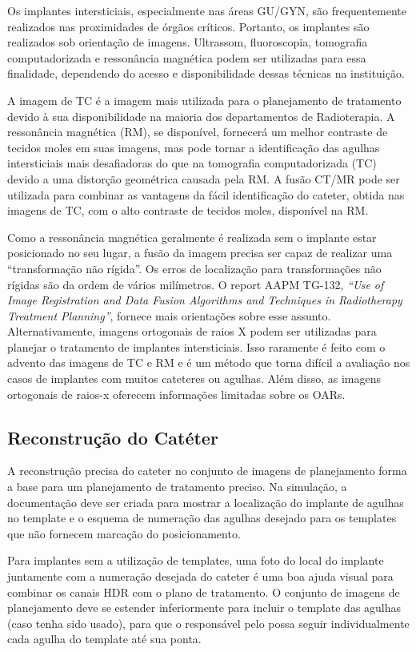 \documentclass[11pt,a4paper]{article}
\begin{document}
	Os implantes intersticiais, especialmente nas áreas GU/GYN, são frequentemente realizados nas proximidades de órgãos críticos. Portanto, os implantes são realizados sob orientação de imagens. Ultrassom, fluoroscopia, tomografia computadorizada e ressonância magnética podem ser utilizadas para essa finalidade, dependendo do acesso e disponibilidade dessas técnicas na instituição.

	A imagem de TC é a imagem mais utilizada para o planejamento de tratamento devido à sua disponibilidade na maioria dos departamentos de Radioterapia. A ressonância magnética (RM), se disponível, fornecerá um melhor contraste de tecidos moles em suas imagens, mas pode tornar a identificação das agulhas intersticiais mais desafiadoras do que na tomografia computadorizada (TC) devido a uma distorção geométrica causada pela RM. A fusão CT/MR pode ser utilizada para combinar as vantagens da fácil identificação do cateter, obtida nas imagens de TC, com o alto contraste de tecidos moles, disponível na RM.

	Como a ressonância magnética geralmente é realizada sem o implante estar posicionado no seu lugar, a fusão da imagem precisa ser capaz de realizar uma ``transformação não rígida''. Os erros de localização para transformações não rígidas são da ordem de vários milímetros. O report AAPM TG-132, \textit{``Use of Image Registration and Data Fusion Algorithms and Techniques in Radiotherapy Treatment Planning''}, fornece mais orientações sobre esse assunto. Alternativamente, imagens ortogonais de raios X podem ser utilizadas para planejar o tratamento de implantes intersticiais. Isso raramente é feito com o advento das imagens de TC e RM e é um método que torna difícil a avaliação nos casos de implantes com muitos cateteres ou agulhas. Além disso,  as imagens ortogonais de raios-x oferecem informações limitadas sobre os OARs.

\subsection*{Reconstrução do Catéter}

	A reconstrução precisa do cateter no conjunto de imagens de planejamento forma a base para um planejamento de tratamento preciso. Na simulação, a documentação deve ser criada para mostrar a localização do implante de agulhas no template e o esquema de numeração das agulhas desejado para os templates que não fornecem marcação do posicionamento.
	
	Para implantes sem a utilização de templates, uma foto do local do implante juntamente com a numeração desejada do cateter é uma boa ajuda visual para combinar os canais HDR com o plano de tratamento. O conjunto de imagens de planejamento deve se estender inferiormente para incluir o template das agulhas (caso tenha sido usado), para que o responsável pelo possa seguir individualmente cada agulha do template até sua ponta.
\end{document}
